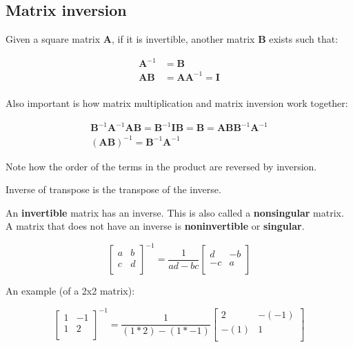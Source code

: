 \documentclass[a4paper,12pt]{article}
\newcommand{\matr}[1]{\mathbf{#1}}
\begin{document}
\subsection{Matrix inversion}

Given a square matrix $\matr{A}$, if it is invertible, another matrix $\matr{B}$ exists such that:

\begin{align*}
\matr{A}^{-1} & = \matr{B}\\
\matr{A}\matr{B} & = \matr{A}\matr{A}^{-1} = \matr{I}\\
\end{align*}

Also important is how matrix multiplication and matrix inversion work together:

\begin{align*}
\matr{B}^{-1}\matr{A}^{-1}\matr{A}\matr{B} = \matr{B}^{-1}\matr{I}\matr{B} = \matr{B} = \matr{A}\matr{B}\matr{B}^{-1}\matr{A}^{-1}\\
(\matr{A}\matr{B})^{-1} = \matr{B}^{-1}\matr{A}^{-1}
\end{align*}

Note how the order of the terms in the product are reversed by inversion.

Inverse of transpose is the transpose of the inverse.

An \textbf{invertible} matrix has an inverse. This is also called a \textbf{nonsingular} matrix. A matrix that does not have an inverse is \textbf{noninvertible} or \textbf{singular}.


\begin{equation*}
\begin{bmatrix}
 a & b \\
 c & d \\
\end{bmatrix}^{-1} = 
\dfrac{1}{ad-bc}
\begin{bmatrix}
 d & -b \\
 -c & a \\
\end{bmatrix}
\end{equation*}


An example (of a 2x2 matrix):

\begin{equation*}
\begin{bmatrix}
 1 & -1 \\
 1 & 2 \\
\end{bmatrix}^{-1} = 
\dfrac{1}{(1*2)-(1*-1)}
\begin{bmatrix}
 2 & -(-1) \\
 -(1) & 1 \\
\end{bmatrix}
\end{equation*}
\end{document}
